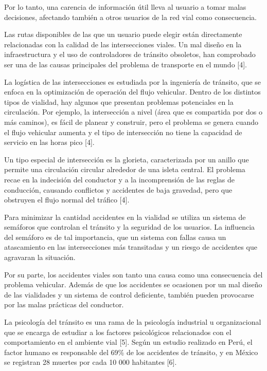 \documentclass[12pt]{article}
\begin{document}
    Por lo tanto, una carencia de información útil lleva al usuario a tomar malas decisiones, afectando también a otros usuarios de la red vial como consecuencia.

    Las rutas disponibles de las que un usuario puede elegir están directamente relacionadas con la calidad de las intersecciones viales. Un mal diseño en la infraestructura y el uso de controladores de tránsito obsoletos, han comprobado ser una de las causas principales del problema de transporte en el mundo [4].
    
    La logística de las intersecciones es estudiada por la ingeniería de tránsito, que se enfoca en la optimización de operación del flujo vehicular. Dentro de los distintos tipos de vialidad, hay algunos que presentan problemas potenciales en la circulación. Por ejemplo, la intersección a nivel (área que es compartida por dos o más caminos), es fácil de planear y construir, pero el problema se genera cuando el flujo vehicular aumenta y el tipo de intersección no tiene la capacidad de servicio en las horas pico [4].

    Un tipo especial de intersección es la glorieta, caracterizada por un anillo que permite una circulación circular alrededor de una isleta central. El problema recae en la indecisión del conductor y a la incomprensión de las reglas de conducción, causando conflictos y accidentes de baja gravedad, pero que obstruyen el flujo normal del tráfico [4].

    Para minimizar la cantidad accidentes en la vialidad se utiliza un sistema de semáforos que controlan el tránsito y la seguridad de los usuarios. La influencia del semáforo es de tal importancia, que un sistema con fallas causa un atascamiento en las intersecciones más transitadas y un riesgo de accidentes que agravaran la situación. 
    
    Por su parte, los accidentes viales son tanto una causa como una consecuencia del problema vehicular. Además de que los accidentes se ocasionen por un mal diseño de las vialidades y un sistema de control deficiente, también pueden provocarse por las malas prácticas del conductor. 
    
    La psicología del tránsito es una rama de la psicología industrial u organizacional que se encarga de estudiar a los factores psicológicos relacionados con el comportamiento en el ambiente vial [5]. Según un estudio realizado en Perú, el factor humano es responsable del 69\% de los accidentes de tránsito, y en México se registran 28 muertes por cada 10 000 habitantes [6]. 
\end{document}
